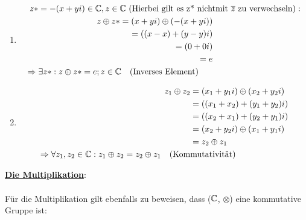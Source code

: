 \begin{Beweis}
\begin{enumerate}[1)]
			\item \begin{align*}
	  					z* = -(x + yi) \in \mathbb{C}, z \in \mathbb{C} \text{ (Hierbei gilt es z* nicht} & \text{mit $\overline{z}$ zu verwechseln)}: \\
								  z \oplus z* = (x + yi) \oplus (-(x + yi)) \text{          } & \\
								  			  = ((x - x) + (y - y)i) \text{ 				} & \\
											  = (0 + 0i) \text{ 							} & \\
											  = e \text{								    } & \\
						\Rightarrow \exists z*: z \oplus z* = e; z \in \mathbb{C} \quad \text{(Inverses Element)} \qquad &
	  			  \end{align*}
			\item \begin{align*}
						z_1 \oplus z_2 &= (x_1 + y_1i) \oplus (x_2 + y_2i) \\
									   &= ((x_1 + x_2) + (y_1 + y_2)i) \\
									   &= ((x_2 + x_1) + (y_2 + y_1)i) \\
									   &= (x_2 + y_2i) \oplus (x_1 + y_1i) \\
									   &= z_2 \oplus z_1 \\
						\Rightarrow \forall z_1, z_2 \in \mathbb{C}: z_1 \oplus z_2 = z_2 \oplus z_1 \quad \text{(Kom}&\text{mutativität)}
				  \end{align*}
		\end{enumerate}
		\newpage
		\underline{\textbf{Die Multiplikation}}:

		\paragraph{} Für die Multiplikation gilt ebenfalls zu beweisen, dass ($\mathbb{C}$, $\otimes$) eine kommutative Gruppe ist:


\end{Beweis}

